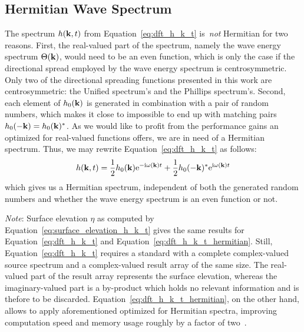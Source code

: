 \subsection{Hermitian Wave Spectrum}
The spectrum $h(\mathbf{k},t)$ from Equation~\ref{eq:dft_h_k_t} is~\emph{not}
Hermitian for two reasons. First, the real-valued part of the spectrum, namely
the wave energy spectrum $\Theta(\mathbf{k})$, would need to be an even function,
which is only the case if the directional spread employed by
the wave energy spectrum is centrosymmetric. Only two of the directional spreading functions
presented in this work are centrosymmetric: the Unified spectrum's and the Phillips spectrum's.
Second, each element of $h_0(\mathbf{k})$ is generated in combination with a pair of random numbers,
which makes it close to impossible to end up with matching pairs $h_0(-\mathbf{k})=h_0(\mathbf{k})^*$.
As we would like to profit from the performance gains an optimized \InvFourierTransform
for real-valued functions offers, we are in need of a Hermitian spectrum. Thus, we may
rewrite Equation~\ref{eq:dft_h_k_t} as follows:
%
\begin{equation}
\label{eq:dft_h_k_t_hermitian}
 h(\mathbf{k}, t) =
 \frac{1}{2} h_0(\mathbf{k})\mathrm{e}^{-\mathrm{i}\omega(\mathbf{k})t}
 + \frac{1}{2} h_0(\mathbf{-k})^*\mathrm{e}^{\mathrm{i}\omega(\mathbf{k})t}
\end{equation}
%
which gives us a Hermitian spectrum, independent of both the generated random numbers and 
whether the wave energy spectrum is an even function or not.

\emph{Note}: Surface elevation $\eta$ as computed by Equation~\ref{eq:surface_elevation_h_k_t}
gives the same results for Equation~\ref{eq:dft_h_k_t} and Equation~\ref{eq:dft_h_k_t_hermitian}.
Still, Equation~\ref{eq:dft_h_k_t} requires a standard \InvFourierTransform
with a complete complex-valued source spectrum and a
complex-valued result array of the same size. The real-valued part of the result array
represents the surface elevation, whereas the imaginary-valued part is a by-product
which holds no relevant information and is thefore to be discarded.
Equation~\ref{eq:dft_h_k_t_hermitian}, on the other hand, allows to apply
aforementioned \InvFourierTransform optimized for Hermitian spectra, improving
computation speed and memory usage roughly by a factor of two~\citep{fftw:manual}.
%
